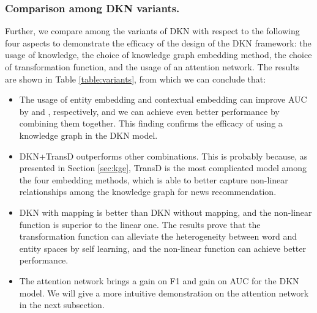 \documentclass[sigconf]{acmart}
\begin{document}
		\subsubsection{Comparison among DKN variants.}			
			Further, we compare among the variants of DKN with respect to the following four aspects to demonstrate the efficacy of the design of the DKN framework: the usage of knowledge, the choice of knowledge graph embedding method, the choice of transformation function, and the usage of an attention network.
			The results are shown in Table \ref{table:variants}, from which we can conclude that:
			\begin{itemize}
				\item
					The usage of entity embedding and contextual embedding can improve AUC by  and , respectively, and we can achieve even better performance by combining them together.
					This finding confirms the efficacy of using a knowledge graph in the DKN model.
				\item
					DKN+TransD outperforms other combinations.
					This is probably because, as presented in Section \ref{sec:kge}, TransD is the most complicated model among the four embedding methods, which is able to better capture non-linear relationships among the knowledge graph for news recommendation.
				\item
					DKN with mapping is better than DKN without mapping, and the non-linear function is superior to the linear one.
					The results prove that the transformation function can alleviate the heterogeneity between word and entity spaces by self learning, and the non-linear function can achieve better performance.
				\item
					The attention network brings a  gain on F1 and  gain on AUC for the DKN model.
					We will give a more intuitive demonstration on the attention network in the next subsection.
			\end{itemize}
	
		
	
\end{document}
